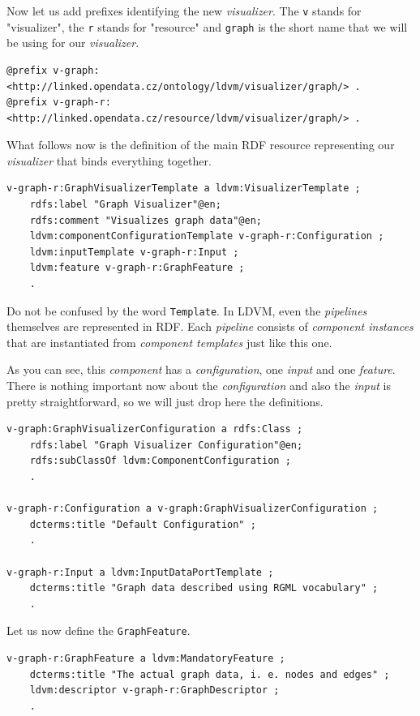 Now let us add prefixes identifying the new \emph{visualizer}. The \texttt{v} stands for "visualizer", the \texttt{r} stands for "resource" and \texttt{graph} is the short name that we will be using for our \emph{visualizer}.

\scriptsize
\begin{verbatim}
@prefix v-graph: <http://linked.opendata.cz/ontology/ldvm/visualizer/graph/> .
@prefix v-graph-r: <http://linked.opendata.cz/resource/ldvm/visualizer/graph/> .
\end{verbatim}
\normalsize

What follows now is the definition of the main RDF resource representing our \emph{visualizer} that binds everything together.

\scriptsize
\begin{verbatim}
v-graph-r:GraphVisualizerTemplate a ldvm:VisualizerTemplate ;
    rdfs:label "Graph Visualizer"@en;
    rdfs:comment "Visualizes graph data"@en;
    ldvm:componentConfigurationTemplate v-graph-r:Configuration ;
    ldvm:inputTemplate v-graph-r:Input ;
    ldvm:feature v-graph-r:GraphFeature ;
    .
\end{verbatim}
\normalsize

Do not be confused by the word \texttt{Template}. In LDVM, even the \emph{pipelines} themselves are represented in RDF. Each \emph{pipeline} consists of \emph{component instances} that are instantiated from \emph{component templates} just like this one.

As you can see, this \emph{component} has a \emph{configuration}, one \emph{input} and one \emph{feature}. There is nothing important now about the \emph{configuration} and also the \emph{input} is pretty straightforward, so we will just drop here the definitions.

\scriptsize
\begin{verbatim}
v-graph:GraphVisualizerConfiguration a rdfs:Class ;
    rdfs:label "Graph Visualizer Configuration"@en;
    rdfs:subClassOf ldvm:ComponentConfiguration ;
    .
  
v-graph-r:Configuration a v-graph:GraphVisualizerConfiguration ;
    dcterms:title "Default Configuration" ;
    .

v-graph-r:Input a ldvm:InputDataPortTemplate ;
    dcterms:title "Graph data described using RGML vocabulary" ;
    .
\end{verbatim}
\normalsize

Let us now define the \texttt{GraphFeature}.

\scriptsize
\begin{verbatim}
v-graph-r:GraphFeature a ldvm:MandatoryFeature ;
    dcterms:title "The actual graph data, i. e. nodes and edges" ;
    ldvm:descriptor v-graph-r:GraphDescriptor ;
    .
\end{verbatim}
\normalsize

